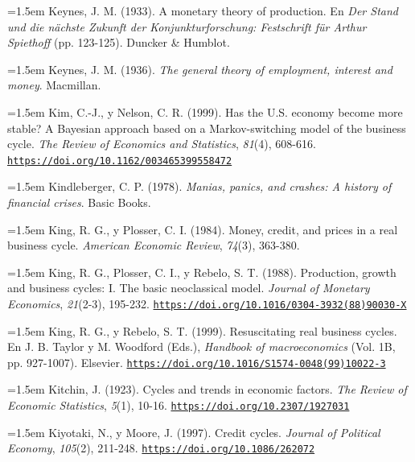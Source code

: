 \documentclass[10pt,a4paper]{article}
\begin{document}
\noindent\hangindent=1.5em Keynes, J. M. (1933). A monetary theory of production. En \textit{Der Stand und die nächste Zukunft der Konjunkturforschung: Festschrift für Arthur Spiethoff} (pp. 123-125). Duncker \& Humblot.

\noindent\hangindent=1.5em Keynes, J. M. (1936). \textit{The general theory of employment, interest and money}. Macmillan.

\noindent\hangindent=1.5em Kim, C.-J., y Nelson, C. R. (1999). Has the U.S. economy become more stable? A Bayesian approach based on a Markov-switching model of the business cycle. \textit{The Review of Economics and Statistics}, \textit{81}(4), 608-616. \href{https://doi.org/10.1162/003465399558472}{\nolinkurl{https://doi.org/10.1162/003465399558472}}

\noindent\hangindent=1.5em Kindleberger, C. P. (1978). \textit{Manias, panics, and crashes: A history of financial crises}. Basic Books.

\noindent\hangindent=1.5em King, R. G., y Plosser, C. I. (1984). Money, credit, and prices in a real business cycle. \textit{American Economic Review}, \textit{74}(3), 363-380.

\noindent\hangindent=1.5em King, R. G., Plosser, C. I., y Rebelo, S. T. (1988). Production, growth and business cycles: I. The basic neoclassical model. \textit{Journal of Monetary Economics}, \textit{21}(2-3), 195-232. \href{https://doi.org/10.1016/0304-3932(88)90030-X}{\nolinkurl{https://doi.org/10.1016/0304-3932(88)90030-X}}

\noindent\hangindent=1.5em King, R. G., y Rebelo, S. T. (1999). Resuscitating real business cycles. En J. B. Taylor y M. Woodford (Eds.), \textit{Handbook of macroeconomics} (Vol. 1B, pp. 927-1007). Elsevier. \href{https://doi.org/10.1016/S1574-0048(99)10022-3}{\nolinkurl{https://doi.org/10.1016/S1574-0048(99)10022-3}}

\noindent\hangindent=1.5em Kitchin, J. (1923). Cycles and trends in economic factors. \textit{The Review of Economic Statistics}, \textit{5}(1), 10-16. \href{https://doi.org/10.2307/1927031}{\nolinkurl{https://doi.org/10.2307/1927031}}

\noindent\hangindent=1.5em Kiyotaki, N., y Moore, J. (1997). Credit cycles. \textit{Journal of Political Economy}, \textit{105}(2), 211-248. \href{https://doi.org/10.1086/262072}{\nolinkurl{https://doi.org/10.1086/262072}}
\end{document}
